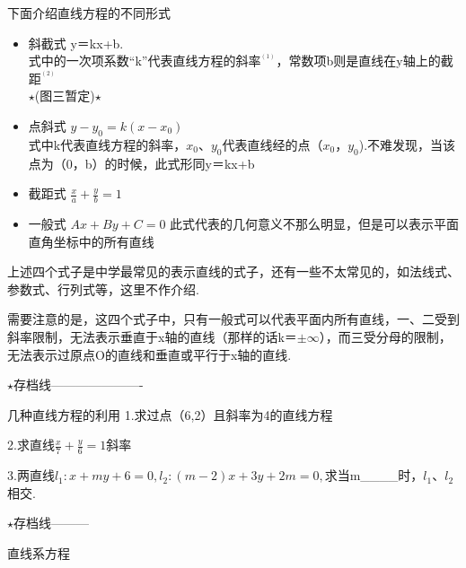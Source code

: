 下面介绍直线方程的不同形式
\begin{itemize}
\item 斜截式
y＝kx+b.
\\式中的一次项系数“k”代表直线方程的斜率$^{^{(1)}}$，常数项b则是直线在y轴上的截距$^{^{(2)}}$ 
\\ $\star$(图三暂定)$\star$
\item 点斜式
$y-y_0=k(x-x_0)$
\\式中k代表直线方程的斜率，$x_0$、$y_0$代表直线经的点（$x_0$，$y_0$).不难发现，当该点为（0，b）的时候，此式形同y＝kx+b
\item 截距式
$\frac{x}{a}+\frac{y}{b}=1$
\item 一般式
$Ax+By+C=0$
此式代表的几何意义不那么明显，但是可以表示平面直角坐标中的所有直线
\end{itemize}
上述四个式子是中学最常见的表示直线的式子，还有一些不太常见的，如法线式、参数式、行列式等，这里不作介绍.
\begin{issues}
需要注意的是，这四个式子中，只有一般式可以代表平面内所有直线，一、二受到斜率限制，无法表示垂直于x轴的直线（那样的话k＝$\pm \infty$），而三受分母的限制，无法表示过原点O的直线和垂直或平行于x轴的直线.
\end{issues}
$\star$存档线----------------------
\begin{exercise}{几种直线方程的利用}
1.求过点（6,2）且斜率为4的直线方程


2.求直线$\frac{x}{7}+\frac{y}{6}=1$斜率

3.两直线$l_1:x+my+6=0,l_2:(m-2)x+3y+2m=0,$求当m____时，$l_1$、$l_2$相交.
\end{exercise}
$\star$存档线---------

直线系方程
